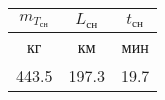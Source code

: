 \begin{tabular}{|c|c|c|}
\hline
$m_{T_{сн}}$ & $L_{сн}$ & $t_{сн}$ \\ 
\hline
кг & км & мин \\ 
\hline
443.5 & 197.3 & 19.7 \\ 
\hline
\end{tabular}